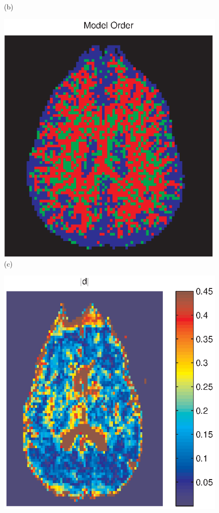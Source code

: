 \documentclass[authoryear,preprint,12pt]{elsarticle}
\begin{document}
\begin{figure}[p]
\begin{center}
\begin{minipage}[]{.30\textwidth}
       (b)
      \end{minipage}
      \begin{minipage}[]{.30\textwidth}
      \centering
      \includegraphics[width=\textwidth]{modelorderchosen2.eps}
       (c)
      \end{minipage}
      \begin{minipage}[]{.30\textwidth}
      \centering
      \includegraphics[width=\textwidth]{absdgg.eps}

\end{minipage}
\end{center}
\end{figure}
\end{document}
